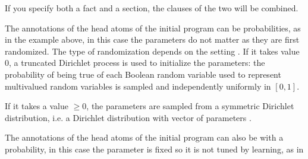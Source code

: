 \documentclass[letterpaper,10pt,english]{sphinxmanual}
\begin{document}
\begin{sphinxVerbatim}[commandchars=\\\{\}]
 

 
 
 

 
\end{sphinxVerbatim}

\sphinxAtStartPar
If you specify both a  fact and a section, the clauses of the two will be combined.

\sphinxAtStartPar
The annotations of the head atoms of the initial program can be probabilities, as in the example above, in this case the parameters do not matter as they are first randomized. The type of randomization depends on the setting .
If it takes value 0, a truncated Dirichlet process is used to initialize the parameters: the probability of being true of each Boolean random variable used to represent multivalued random variables is sampled and independently uniformly in \([0,1]\).

\sphinxAtStartPar
If it takes a value \(\geq 0\), the parameters are sampled from a symmetric Dirichlet distribution, i.e. a Dirichlet distribution with vector of parameters .

\sphinxAtStartPar
The annotations of the head atoms of the initial program can also be  with  a probability, in this case the parameter is fixed so it is not tuned by learning, as in

\begin{sphinxVerbatim}[commandchars=\\\{\}]
\PYG{p}{[} 
         
        \PYG{p}{]}
\end{sphinxVerbatim}
\end{document}
